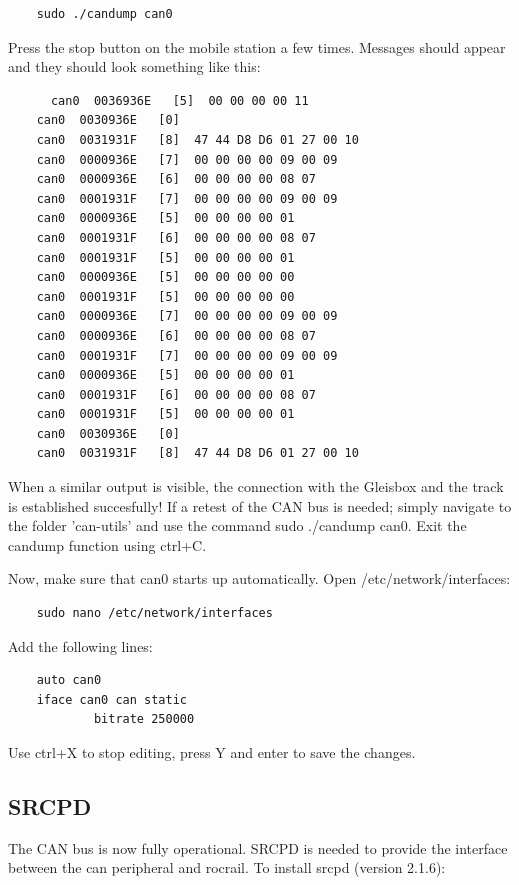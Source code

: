 \begin{verbatim}
	sudo ./candump can0
\end{verbatim}

Press the stop button on the mobile station a few times. Messages should appear and they should look something like this:

\begin{verbatim}
	  can0  0036936E   [5]  00 00 00 00 11
	can0  0030936E   [0]
	can0  0031931F   [8]  47 44 D8 D6 01 27 00 10
	can0  0000936E   [7]  00 00 00 00 09 00 09
	can0  0000936E   [6]  00 00 00 00 08 07
	can0  0001931F   [7]  00 00 00 00 09 00 09
	can0  0000936E   [5]  00 00 00 00 01
	can0  0001931F   [6]  00 00 00 00 08 07
	can0  0001931F   [5]  00 00 00 00 01
	can0  0000936E   [5]  00 00 00 00 00
	can0  0001931F   [5]  00 00 00 00 00
	can0  0000936E   [7]  00 00 00 00 09 00 09
	can0  0000936E   [6]  00 00 00 00 08 07
	can0  0001931F   [7]  00 00 00 00 09 00 09
	can0  0000936E   [5]  00 00 00 00 01
	can0  0001931F   [6]  00 00 00 00 08 07
	can0  0001931F   [5]  00 00 00 00 01
	can0  0030936E   [0]
	can0  0031931F   [8]  47 44 D8 D6 01 27 00 10
\end{verbatim}

When a similar output is visible, the connection with the Gleisbox and the track is established succesfully! If a retest of the CAN bus is needed; simply navigate to the folder 'can-utils' and use the command sudo ./candump can0. Exit the candump function using ctrl+C.

Now, make sure that can0 starts up automatically. Open /etc/network/interfaces:

\begin{verbatim}
	sudo nano /etc/network/interfaces
\end{verbatim}

Add the following lines:

\begin{verbatim}
	auto can0
	iface can0 can static
			bitrate 250000
\end{verbatim}

Use ctrl+X to stop editing, press Y and enter to save the changes.

\subsection{SRCPD}
The CAN bus is now fully operational. SRCPD is needed to provide the interface between the can peripheral and rocrail. To install srcpd (version 2.1.6):

